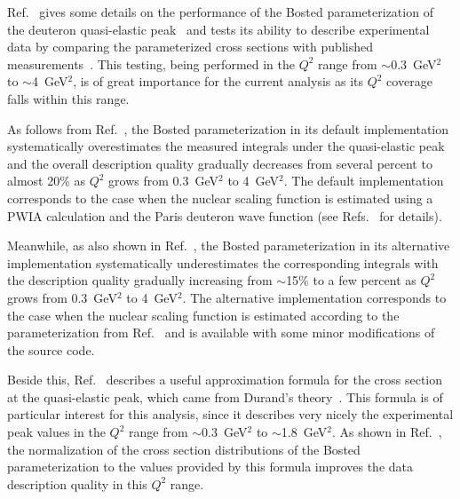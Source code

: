 Ref.~\cite{note_QE_peak} gives some details on the performance of the Bosted parameterization of the deuteron quasi-elastic peak~\cite{Bosted_fit,Bosted:2007xd} and tests its ability to describe experimental data by comparing the parameterized cross sections with published measurements~\cite{Hanson:1973vf,Rock:1991jy,Rock_SLAC}. This testing, being performed in the $Q^{2}$ range from $\sim$0.3~GeV$^2$ to $\sim$4~GeV$^2$, is of great importance for the current analysis as its $Q^{2}$ coverage falls within this range.


As follows from Ref.~\cite{note_QE_peak}, the Bosted parameterization in its default implementation systematically overestimates the measured integrals under the quasi-elastic peak and the overall description quality gradually decreases from several percent to almost 20\% as $Q^2$ grows from 0.3~GeV$^2$ to 4~GeV$^2$. The default implementation corresponds to the case when the nuclear scaling function is estimated using a PWIA calculation and the Paris deuteron wave function (see Refs.~\cite{Bosted_fit,Bosted:2007xd} for details). 

Meanwhile, as also shown in Ref.~\cite{note_QE_peak}, the Bosted parameterization in its alternative implementation systematically underestimates the corresponding integrals with the description quality gradually increasing from $\sim$15\% to a few percent as $Q^2$ grows from 0.3~GeV$^2$ to 4~GeV$^2$. The alternative implementation corresponds to the case when the nuclear scaling function is estimated according to the parameterization from Ref.~\cite{Bodek:2014pka} and is available with some minor modifications of the source code. 


Beside this, Ref.~\cite{note_QE_peak} describes a useful approximation formula for the cross section at the quasi-elastic peak, which came from Durand's theory~\cite{Durand:1961zz}. This formula is of particular interest for this analysis, since it describes very nicely the experimental peak values in the $Q^{2}$ range from $\sim$0.3~GeV$^2$ to $\sim$1.8~GeV$^2$. As shown in Ref.~\cite{note_QE_peak}, the normalization of the cross section distributions of the Bosted parameterization to the values provided by this formula improves the data description quality in this $Q^{2}$ range.




